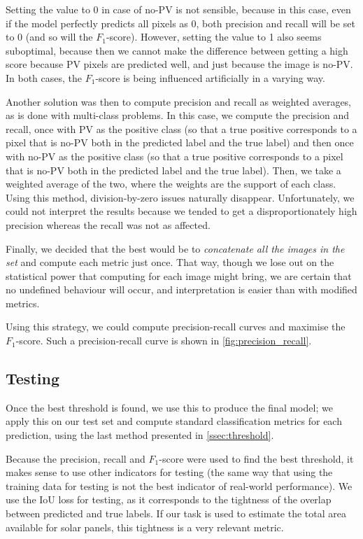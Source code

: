 \documentclass[10pt,conference]{IEEEtran}
\begin{document}
Setting the value to 0 in case of no-PV is not sensible,
because in this case, even if the model perfectly predicts
all pixels as 0, both precision and recall will be set to 0
(and so will the $F_1$-score).
However, setting the value to 1 also seems suboptimal, because
then we cannot make the difference between getting
a high score because PV pixels are predicted well, and just because the image is no-PV.
In both cases, the $F_1$-score is being influenced artificially in a varying way.

Another solution was then to compute precision and recall
as weighted averages, as is done with multi-class
problems.
In this case, we compute the precision and recall, once 
with PV as the positive class (so that a true positive corresponds to a pixel that is no-PV both in the predicted label and the true label) and then once with no-PV as the
positive class (so that a true positive corresponds to a pixel that is no-PV both in the predicted label and the true label).
Then, we take a weighted average of
the two, where the weights are the support of each class.
Using this method, division-by-zero issues naturally disappear.
Unfortunately, we could not interpret the results because
we tended to get a disproportionately high
precision whereas the recall was not as affected.

Finally, we decided that the best would be to \textit{concatenate all the images
in the set} and compute each metric just once.
That way, though we lose out on the statistical power
that computing for each image might bring, we are
certain that no undefined behaviour will occur, and interpretation is easier than with modified metrics.

Using this strategy, we could compute precision-recall curves and maximise the $F_1$-score. Such a precision-recall curve is shown in \autoref{fig:precision_recall}.

\subsection{Testing}
Once the best threshold is found, we use this to produce
the final model; we apply this on our test set and compute
standard classification metrics for each prediction,
using the last method presented in \autoref{ssec:threshold}.

Because the precision, recall and $F_1$-score were used
to find the best threshold, it makes sense to use other indicators for testing (the same way that using the training data for testing is not the best indicator of real-world performance).
We use the IoU loss for testing, as
it corresponds to the tightness of the overlap between
predicted and true labels.
If our task is used to estimate the total area available
for solar panels, this tightness is a very relevant metric.
\end{document}
